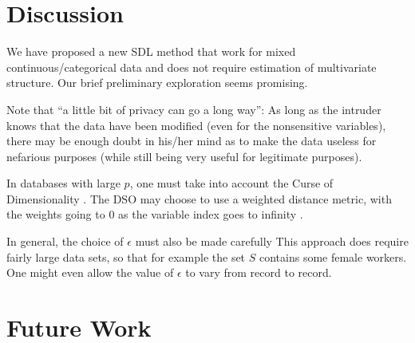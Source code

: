 \documentclass[11pt]{article}
\begin{document}




\section{Discussion}

We have proposed a new SDL method that work for mixed
continuous/categorical data and does not require estimation of
multivariate structure.  Our brief preliminary exploration seems
promising.

Note that ``a little bit of privacy can go a long way'':  As long as the
intruder knows that the data have been modified (even for the
nonsensitive variables), there may be enough doubt in his/her mind as to
make the data useless for nefarious purposes (while still being very
useful for legitimate purposes).

In databases with large $p$, one must take into account the Curse of
Dimensionality \cite{beyer}.  The DSO may choose to use a weighted
distance metric, with the weights going to 0 as the variable index goes
to infinity \cite{matloff2015}.

In general, the choice of $\epsilon$ must also be made carefully
This approach does require fairly large data sets, so that for example
the set $S$ contains some female workers.  One might even allow the
value of $\epsilon$ to vary from record to record.

\section{Future Work}
\end{document}
